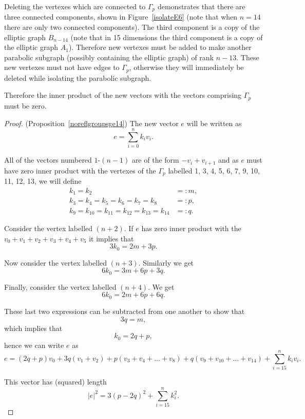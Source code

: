 \documentclass[smallcondensed]{svjour3}                     %
\begin{document}
Deleting the vertexes which are connected to $\Gamma_p$ demonstrates that there are three connected components, shown in Figure~\ref{isolateE6} (note that when $n=14$ there are only two connected components). The third component is a copy of the elliptic graph $B_{n-14}$ (note that in 15 dimensions the third component is a copy of the elliptic graph $A_1$). Therefore new vertexes must be added to make another parabolic subgraph (possibly containing the elliptic graph) of rank $n-13$. These new vertexes must not have edges to $\Gamma_p$, otherwise they will immediately be deleted while isolating the parabolic subgraph.

Therefore the inner product of the new vectors with the vectors comprising $\Gamma_p$ must be zero.

\begin{proof}{(Proposition~\ref{noreflgroupsge14})}
The new vector $e$ will be written as
\[e = \sum_{i=0}^n k_iv_i.\]

All of the vectors numbered $1$-$(n-1)$ are of the form $-v_i + v_{i+1}$ and as $e$ must have zero inner product with the vertexes of the $\Gamma_p$ labelled 1, 3, 4, 5, 6, 7, 9, 10, 11, 12, 13,  we will define
\begin{eqnarray*}
k_1 = k_2  &=: m,\\
k_3 = k_4 = k_5 = k_6 = k_7 = k_8 &=: p,\\
k_9 = k_{10} = k_{11} = k_{12} = k_{13} = k_{14} &=: q.
\end{eqnarray*}

Consider the vertex labelled $(n+2)$.  If $e$ has zero inner product with the $v_0 + v_1 + v_2 + v_3 + v_4 + v_5$ it implies that
\[3 k_0 = 2m + 3p.\]

Now consider the vertex labelled $(n+3)$. Similarly we get
\[6k_0 = 3m + 6p + 3q.\]

Finally, consider the vertex labelled $(n+4)$. We get
\[6k_0 = 2m + 6p + 6q.\]

These last two expressions can be subtracted from one another to show that
\[3q = m,\]
which implies that
\[k_0 = 2q + p,\]
hence  we can write $e$ as
\begin{equation}\label{vector}
e = (2q + p) v_0 + 3q(v_1 + v_2) + p(v_3 + v_4 + \ldots + v_8) + q(v_9 + v_{10} + \ldots + v_{14}) + \sum_{i=15}^n k_i v_i.
\end{equation}

This vector has (squared) length
\begin{equation}\label{squared_length}
|e|^2 = 3(p-2q)^2 + \sum_{i=15}^n k_i^2.
\end{equation}


\end{proof}
\end{document}
